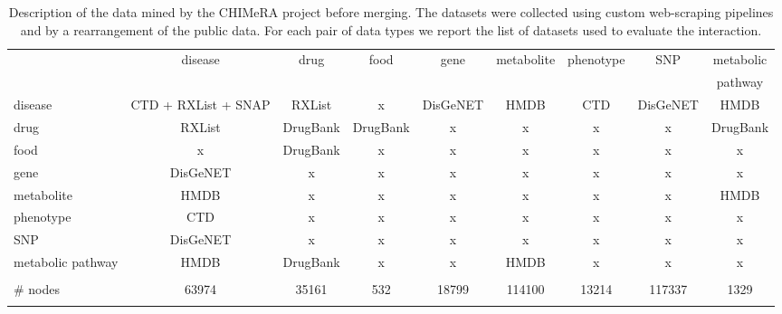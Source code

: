 \documentclass{standalone}
\begin{document}
\begin{table}
\centering
\begin{tabular}{lcccccccc}
\hline\rowcolor{darkgrayrow}
                        & disease             & drug     & food     & gene     & metabolite & phenotype & SNP      & metabolic \\
\rowcolor{darkgrayrow}
                        &                     &          &          &          &            &           &          & pathway   \\
disease                 & CTD + RXList + SNAP & RXList   &    x     & DisGeNET &  HMDB      & CTD       & DisGeNET & HMDB      \\
drug                    &       RXList        & DrugBank & DrugBank &    x     &    x       &    x      &     x    & DrugBank  \\
food                    &          x          & DrugBank &    x     &    x     &    x       &    x      &     x    &    x      \\
gene                    &      DisGeNET       &    x     &    x     &    x     &    x       &    x      &     x    &    x      \\
metabolite              &       HMDB          &    x     &    x     &    x     &    x       &    x      &     x    & HMDB      \\
phenotype               &        CTD          &    x     &    x     &    x     &    x       &    x      &     x    &    x      \\
SNP                     &      DisGeNET       &    x     &    x     &    x     &    x       &    x      &     x    &    x      \\
metabolic pathway       &        HMDB         & DrugBank &    x     &    x     &  HMDB      &    x      &     x    &    x      \\
\hline\\
\# nodes                &  63974              & 35161    & 532      & 18799    &  114100    & 13214     & 117337   &  1329     \\
\hline\\
\end{tabular}
\caption{Description of the data mined by the \textsf{CHIMeRA} project before merging.
The datasets were collected using custom web-scraping pipelines and by a rearrangement of the public data.
For each pair of data types we report the list of datasets used to evaluate the interaction.
}
\label{tab:chimera_db}
\end{table}
\end{document}
